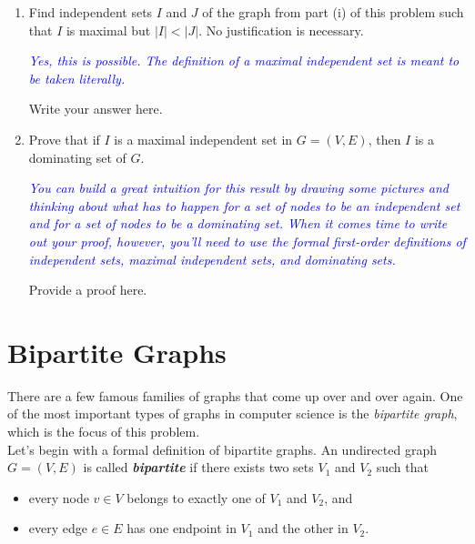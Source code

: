 \documentclass{article}
\newcommand{\abs}[1]{\lvert #1 \rvert}
\renewcommand{\(}{\left(}
\renewcommand{\)}{\right)}
\theoremstyle{plain}
\theoremstyle{plain}
\theoremstyle{definition}
\renewcommand{\emph}[1]{\textit{\textbf{#1}}}
\newcommand{\annotate}[1]{\textit{\textcolor{blue}{#1}}}
\begin{document}
\begin{enumerate}[resume*]
  \item Find independent sets $I$ and $J$ of the graph from part (i) of this
    problem such that $I$ is maximal but $\abs{I} < \abs{J}$. No justification
    is necessary.

    \annotate{Yes, this is possible. The definition of a maximal independent
      set is meant to be taken literally.}

    \begin{shaded}
      Write your answer here.
    \end{shaded}

  \item Prove that if $I$ is a maximal independent set in $G = (V, E)$, then
    $I$ is a dominating set of $G$.

    \annotate{You can build a great intuition for this result by drawing some
      pictures and thinking about what has to happen for a set of nodes to be
      an independent set and for a set of nodes to be a dominating set. When it
      comes time to write out your proof, however, you'll need to use the
      formal first-order definitions of independent sets, maximal independent
      sets, and dominating sets.}

    \begin{shaded}
      Provide a proof here.
    \end{shaded}
\end{enumerate}

\pagebreak


\section{Bipartite Graphs}

There are a few famous families of graphs that come up over and over again. One of the most important types of graphs in computer science is the \textit{bipartite graph}, which is the focus of this problem. \\

Let's begin with a formal definition of bipartite graphs. An undirected graph $G = (V, E)$ is called \emph{bipartite} if there exists two sets $V_1$ and $V_2$ such that
\begin{itemize}
\item every node $v \in V$ belongs to exactly one of $V_1$ and $V_2$,
and
\item every edge $e \in E$ has one endpoint in $V_1$ and the other in $V_2$.
\end{itemize}
\end{document}
